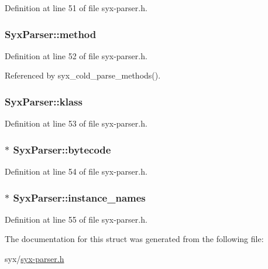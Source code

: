 Definition at line 51 of file syx-parser.h.\hypertarget{struct_syx_parser_142af50e1b05b7a5709b07781f40c9aa}{
\subsubsection{ {\bf SyxParser::method}}}
\label{struct_syx_parser_142af50e1b05b7a5709b07781f40c9aa}




Definition at line 52 of file syx-parser.h.

Referenced by syx\_\-cold\_\-parse\_\-methods().\hypertarget{struct_syx_parser_e0f443e4febc0a9c32b5b8a2db4af651}{
\subsubsection{ {\bf SyxParser::klass}}}
\label{struct_syx_parser_e0f443e4febc0a9c32b5b8a2db4af651}




Definition at line 53 of file syx-parser.h.\hypertarget{struct_syx_parser_8c501f2674cef13a7c57b17dd12da0a9}{
\subsubsection{$\ast$ {\bf SyxParser::bytecode}}}
\label{struct_syx_parser_8c501f2674cef13a7c57b17dd12da0a9}




Definition at line 54 of file syx-parser.h.\hypertarget{struct_syx_parser_073d58efe7b5816532014aed095179ec}{
\subsubsection{$\ast$ {\bf SyxParser::instance\_\-names}}}
\label{struct_syx_parser_073d58efe7b5816532014aed095179ec}




Definition at line 55 of file syx-parser.h.

The documentation for this struct was generated from the following file:\begin{CompactItemize}
\item 
syx/\hyperlink{syx-parser_8h}{syx-parser.h}\end{CompactItemize}
